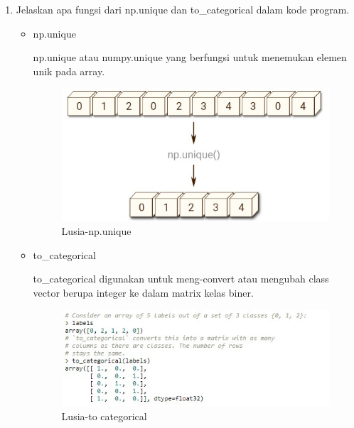 \begin{enumerate}
\item Jelaskan apa fungsi dari np.unique dan to\_categorical dalam kode program.
	\begin{itemize}
	\item np.unique 
		\par np.unique atau numpy.unique yang berfungsi untuk menemukan elemen unik pada array.
		\begin{figure}[!hbtp]
		\centering
		\includegraphics[scale=0.4]{figures/s7a.jpg}
		\caption{Lusia-np.unique}
		\label{6A7}
		\end{figure}
	\item to\_categorical
		\par to\_categorical digunakan untuk meng-convert atau mengubah class vector berupa integer ke dalam matrix kelas biner.
		\begin{figure}[!hbtp]
		\centering
		\includegraphics[scale=0.4]{figures/s7b.jpg}
		\caption{Lusia-to categorical}
		\label{6A8}
		\end{figure}
	\end{itemize}
	

\end{enumerate}
